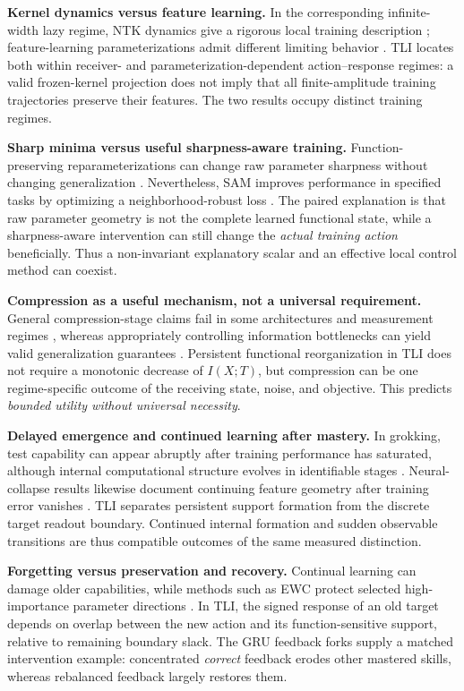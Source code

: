 \documentclass[10pt,twocolumn,letterpaper]{article}
\begin{document}
\noindent\textbf{Kernel dynamics versus feature learning.}
In the corresponding infinite-width lazy regime, NTK dynamics give a rigorous local training description \cite{jacot2018}; feature-learning parameterizations admit different limiting behavior \cite{yang2021}. TLI locates both within receiver- and parameterization-dependent action--response regimes: a valid frozen-kernel projection does not imply that all finite-amplitude training trajectories preserve their features. The two results occupy distinct training regimes.

\noindent\textbf{Sharp minima versus useful sharpness-aware training.}
Function-preserving reparameterizations can change raw parameter sharpness without changing generalization \cite{dinh2017}. Nevertheless, SAM improves performance in specified tasks by optimizing a neighborhood-robust loss \cite{foret2021}. The paired explanation is that raw parameter geometry is not the complete learned functional state, while a sharpness-aware intervention can still change the \emph{actual training action} beneficially. Thus a non-invariant explanatory scalar and an effective local control method can coexist.

\noindent\textbf{Compression as a useful mechanism, not a universal requirement.}
General compression-stage claims fail in some architectures and measurement regimes \cite{saxe2018}, whereas appropriately controlling information bottlenecks can yield valid generalization guarantees \cite{kawaguchi2023}. Persistent functional reorganization in TLI does not require a monotonic decrease of $I(X;T)$, but compression can be one regime-specific outcome of the receiving state, noise, and objective. This predicts \emph{bounded utility without universal necessity}.

\noindent\textbf{Delayed emergence and continued learning after mastery.}
In grokking, test capability can appear abruptly after training performance has saturated, although internal computational structure evolves in identifiable stages \cite{nanda2023}. Neural-collapse results likewise document continuing feature geometry after training error vanishes \cite{papyan2020}. TLI separates persistent support formation from the discrete target readout boundary. Continued internal formation and sudden observable transitions are thus compatible outcomes of the same measured distinction.

\noindent\textbf{Forgetting versus preservation and recovery.}
Continual learning can damage older capabilities, while methods such as EWC protect selected high-importance parameter directions \cite{kirkpatrick2017}. In TLI, the signed response of an old target depends on overlap between the new action and its function-sensitive support, relative to remaining boundary slack. The GRU feedback forks supply a matched intervention example: concentrated \emph{correct} feedback erodes other mastered skills, whereas rebalanced feedback largely restores them. 
\end{document}

